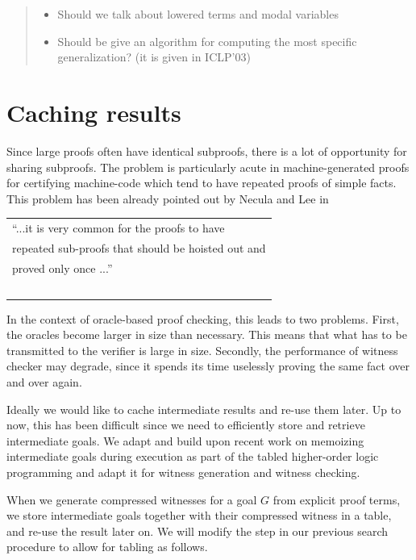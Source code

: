 \documentclass{acmconf}
\newenvironment{note}{\begin{quote}\message{note!}\it}{\end{quote}}
\begin{document}
\begin{note}
  \begin{itemize}
  \item Should we talk about lowered terms and modal variables
  \item Should be give an algorithm for computing the most specific
    generalization? (it is given in ICLP'03)
  \end{itemize}
\end{note}


\section{Caching results}
\label{sec:tabling}
Since large proofs often have identical subproofs,  there is a
lot of opportunity for sharing subproofs. The problem is particularly
acute in machine-generated proofs for certifying machine-code which
tend to have repeated proofs of simple facts. This problem has been
already pointed out by Necula and Lee in \cite{NeculaLee+97:resource}

 \begin{tabular}[h]{l}
``...it is very common for the proofs to have  \\
repeated sub-proofs that should be hoisted out and \\
proved only once ...'' \cite{NeculaLee+97:resource}\\ $\;$
 \end{tabular}


In the context of oracle-based proof checking, this leads to two
problems.  First, the oracles become larger in size than
necessary. This means that what has to be transmitted to the verifier
is large in size. Secondly, the performance of witness checker may
degrade, since it spends its time uselessly proving the same fact over
and over again. 

Ideally we would like to cache intermediate results and re-use them
later. Up to now, this has been difficult since we need to efficiently
store and retrieve intermediate goals. We adapt and build upon recent
work \cite{Pientka03phd} on memoizing intermediate goals during
execution as part of the tabled higher-order logic programming and
adapt it for witness generation and witness checking. 

When we generate compressed witnesses for a goal $G$ from explicit
proof terms, we store intermediate goals together with their
compressed witness in a table, and re-use the result later on. 
We will modify the {} step in our previous search procedure
to allow for tabling as follows.
\end{document}

